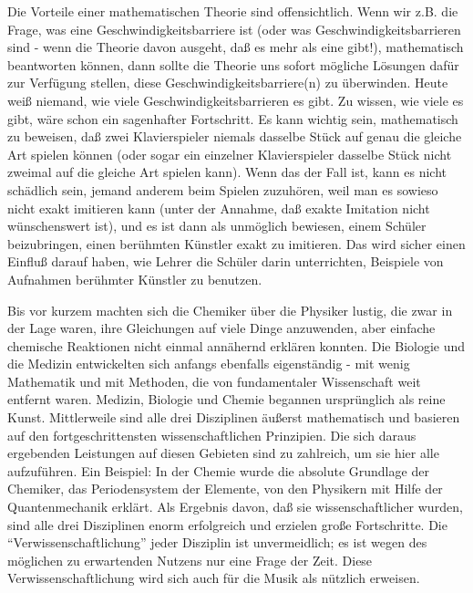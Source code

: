 Die Vorteile einer mathematischen Theorie sind offensichtlich.
Wenn wir z.B. die Frage, was eine Geschwindigkeitsbarriere ist (oder was Geschwindigkeitsbarrieren sind - wenn die Theorie davon ausgeht, daß es mehr als eine gibt!), mathematisch beantworten können, dann sollte die Theorie uns sofort mögliche Lösungen dafür zur Verfügung stellen, diese Geschwindigkeitsbarriere(n) zu überwinden.
Heute weiß niemand, wie viele Geschwindigkeitsbarrieren es gibt.
Zu wissen, wie viele es gibt, wäre schon ein sagenhafter Fortschritt.
Es kann wichtig sein, mathematisch zu beweisen, daß zwei Klavierspieler niemals dasselbe Stück auf genau die gleiche Art spielen können (oder sogar ein einzelner Klavierspieler dasselbe Stück nicht zweimal auf die gleiche Art spielen kann).
Wenn das der Fall ist, kann es nicht schädlich sein, jemand anderem beim Spielen zuzuhören, weil man es sowieso nicht exakt imitieren kann (unter der Annahme, daß exakte Imitation nicht wünschenswert ist), und es ist dann als unmöglich bewiesen, einem Schüler beizubringen, einen berühmten Künstler exakt zu imitieren.
Das wird sicher einen Einfluß darauf haben, wie Lehrer die Schüler darin unterrichten, Beispiele von Aufnahmen berühmter Künstler zu benutzen.

Bis vor kurzem machten sich die Chemiker über die Physiker lustig, die zwar in der Lage waren, ihre Gleichungen auf viele Dinge anzuwenden, aber einfache chemische Reaktionen nicht einmal annähernd erklären konnten.
Die Biologie und die Medizin entwickelten sich anfangs ebenfalls eigenständig - mit wenig Mathematik und mit Methoden, die von fundamentaler Wissenschaft weit entfernt waren.
Medizin, Biologie und Chemie begannen ursprünglich als reine Kunst.
Mittlerweile sind alle drei Disziplinen äußerst mathematisch und basieren auf den fortgeschrittensten wissenschaftlichen Prinzipien.
Die sich daraus ergebenden Leistungen auf diesen Gebieten sind zu zahlreich, um sie hier alle aufzuführen.
Ein Beispiel: In der Chemie wurde die absolute Grundlage der Chemiker, das Periodensystem der Elemente, von den Physikern mit Hilfe der Quantenmechanik erklärt.
Als Ergebnis davon, daß sie wissenschaftlicher wurden, sind alle drei Disziplinen enorm erfolgreich und erzielen große Fortschritte.
Die \enquote{Verwissenschaftlichung} jeder Disziplin ist unvermeidlich; es ist wegen des möglichen zu erwartenden Nutzens nur eine Frage der Zeit.
Diese Verwissenschaftlichung wird sich auch für die Musik als nützlich erweisen.

